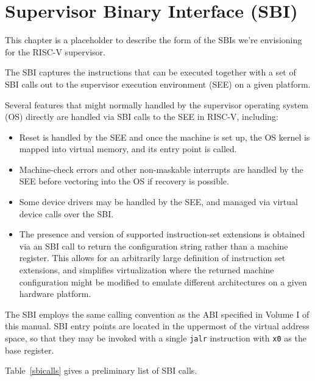 \chapter{Supervisor Binary Interface (SBI)}

This chapter is a placeholder to describe the form of the SBIs we're
envisioning for the RISC-V supervisor.

The SBI captures the instructions that can be executed together with a
set of SBI calls out to the supervisor execution environment (SEE) on
a given platform.

Several features that might normally handled by the supervisor
operating system (OS) directly are handled via SBI calls to the SEE in
RISC-V, including:

\begin{itemize}

\item Reset is handled by the SEE and once the machine is set up, the
  OS kernel is mapped into virtual memory, and its entry point is called.

\item Machine-check errors and other non-maskable interrupts are
  handled by the SEE before vectoring into the OS if recovery is
  possible.

\item Some device drivers may be handled by the SEE, and managed via
  virtual device calls over the SBI.

\item The presence and version of supported instruction-set extensions
  is obtained via an SBI call to return the configuration string
  rather than a machine register.  This allows for an arbitrarily
  large definition of instruction set extensions, and simplifies
  virtualization where the returned machine configuration might be
  modified to emulate different architectures on a given hardware
  platform.

\end{itemize}

The SBI employs the same calling convention as the ABI specified in Volume
I of this manual.  SBI entry points are located in the uppermost
 of the virtual address space, so that they may be invoked with
a single {\tt jalr} instruction with {\tt x0} as the base register.

Table~\ref{sbicalls} gives a preliminary list of SBI calls.

